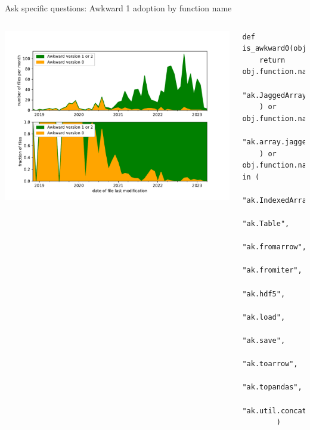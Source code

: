 \documentclass[aspectratio=169]{beamer}
\begin{document}
\begin{frame}[fragile]{Ask specific questions: Awkward 1 adoption by function name}
\vspace{0.15 cm}
\begin{columns}
\includegraphics[width=\linewidth]{analysis/github-ast-awkward-0-1.pdf}

\hspace{-0.7 cm}\begin{minipage}{\linewidth}
\scriptsize
\begin{verbatim}
def is_awkward0(obj):
    return obj.function.name.startswith(
        "ak.JaggedArray"
    ) or obj.function.name.startswith(
        "ak.array.jagged.JaggedArray"
    ) or obj.function.name in (
            "ak.IndexedArray",
            "ak.Table",
            "ak.fromarrow",
            "ak.fromiter",
            "ak.hdf5",
            "ak.load",
            "ak.save",
            "ak.toarrow",
            "ak.topandas",
            "ak.util.concatenate",
        )
\end{verbatim}
\end{minipage}
\end{columns}
\end{frame}
\end{document}
